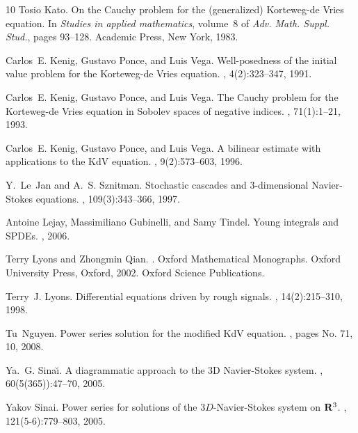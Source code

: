 \documentclass[a4paper,11pt,reqno]{article}
\begin{document}
\begin{thebibliography}{10}
Tosio Kato.
\newblock On the {C}auchy problem for the (generalized) {K}orteweg-de {V}ries
  equation.
\newblock In {\em Studies in applied mathematics}, volume~8 of {\em Adv. Math.
  Suppl. Stud.}, pages 93--128. Academic Press, New York, 1983.

Carlos~E. Kenig, Gustavo Ponce, and Luis Vega.
\newblock Well-posedness of the initial value problem for the {K}orteweg-de
  {V}ries equation.
, 4(2):323--347, 1991.

Carlos~E. Kenig, Gustavo Ponce, and Luis Vega.
\newblock The {C}auchy problem for the {K}orteweg-de {V}ries equation in
  {S}obolev spaces of negative indices.
, 71(1):1--21, 1993.

Carlos~E. Kenig, Gustavo Ponce, and Luis Vega.
\newblock A bilinear estimate with applications to the {K}d{V} equation.
, 9(2):573--603, 1996.

Y.~Le~Jan and A.~S. Sznitman.
\newblock Stochastic cascades and {$3$}-dimensional {N}avier-{S}tokes
  equations.
, 109(3):343--366, 1997.

Antoine Lejay, Massimiliano Gubinelli, and Samy Tindel.
\newblock Young integrals and {SPDE}s.
, 2006.

Terry Lyons and Zhongmin Qian.
.
\newblock Oxford Mathematical Monographs. Oxford University Press, Oxford,
  2002.
\newblock Oxford Science Publications.

Terry~J. Lyons.
\newblock Differential equations driven by rough signals.
, 14(2):215--310, 1998.

Tu~Nguyen.
\newblock Power series solution for the modified {K}d{V} equation.
, pages No. 71, 10, 2008.

Ya.~G. Sina{\u\i}.
\newblock A diagrammatic approach to the 3{D} {N}avier-{S}tokes system.
, 60(5(365)):47--70, 2005.

Yakov Sinai.
\newblock Power series for solutions of the {$3D$}-{N}avier-{S}tokes system on
  {${\bf R}\sp 3$}.
, 121(5-6):779--803, 2005.

\end{thebibliography}
\end{document}
